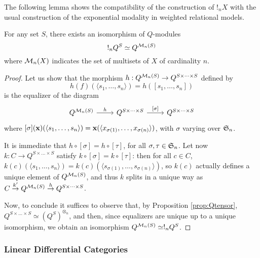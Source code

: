 The following lemma shows the compatibility of the construction of $!_{n}X$ with the usual construction of the exponential modality in weighted relational models.
\begin{lemma}
For any set $S$, there exists an isomorphism of $Q$-modules
$$!_{n}Q^{S} \simeq Q^{\mathcal{M}_{n}(S)}$$
where $\mathcal{M}_{n}(X)$ indicates the set of multisets of $X$ of cardinality $ n$.
\end{lemma}
\begin{proof}
Let us show that the morphism $h:Q^{\mathcal{M}_{n}(S)}\to Q^{S\times \dots \times S}$ defined by 
$$
h(f)(\langle s_{1},\dots, s_{n}\rangle)=h([s_{1},\dots, s_{n}])
$$
is the equalizer of the diagram 
$$
\begin{tikzcd}
Q^{\C M_{n}(S)} \ar{r}{h} &Q^{S\times \dots \times S}\ar{r}{[\sigma]} &
Q^{S\times \dots \times S}
\end{tikzcd}
$$
where $[\sigma](\mathbf{x})(\langle s_{1},\dots, s_{n}\rangle)=\mathbf{x}(\langle x_{\sigma(1)},\dots, x_{\sigma(n)}\rangle)$, with $\sigma$ varying over $\mathfrak{S}_{n}$.

It is immediate that $h\circ [\sigma]=h\circ [\tau]$, for all $\sigma,\tau\in \mathfrak{S}_{n}$. Let now $k: C\to Q^{S\times \dots \times S}$ satisfy $k\circ [\sigma]=k\circ [\tau]$: then for all $c\in C$, $k(c)(\langle s_{1},\dots, s_{n}\rangle)=k(c)(\langle s_{\sigma(1)},\dots, s_{\sigma(n)}\rangle)$, so $k(c)$ actually defines a unique element of $Q^{\mathcal{M}_{n}(S)}$, and thus $k$ splits in a unique way as $C \stackrel{k'}{\to} Q^{\mathcal{M}_{n}(S)} \stackrel{h}{\to}Q^{S\times \dots \times S}$.


Now, to conclude it suffices to observe that, by Proposition \ref{prop:Qtensor}, 
$Q^{S\times \dots \times S}\simeq (Q^{S})^{\otimes_{n}}$, and then, since equalizers are unique up to a unique isomorphism, we obtain an isomorphism $Q^{\mathcal{M}_{n}(S)}\simeq !_{n}Q^{S}$.
%
%
\end{proof}




\subsubsection{Linear Differential Categories}


